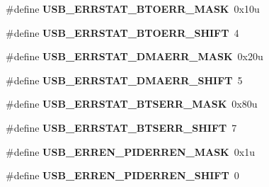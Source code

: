 \begin{DoxyCompactItemize}
\item 
\#define {\bfseries U\+S\+B\+\_\+\+E\+R\+R\+S\+T\+A\+T\+\_\+\+B\+T\+O\+E\+R\+R\+\_\+\+M\+A\+SK}~0x10u\hypertarget{group__USB__Register__Masks_ga64f9bd307b556ecbd454571aa2d1b4c8}{}\label{group__USB__Register__Masks_ga64f9bd307b556ecbd454571aa2d1b4c8}

\item 
\#define {\bfseries U\+S\+B\+\_\+\+E\+R\+R\+S\+T\+A\+T\+\_\+\+B\+T\+O\+E\+R\+R\+\_\+\+S\+H\+I\+FT}~4\hypertarget{group__USB__Register__Masks_gaa6f963350f684e982457839f7bc842e5}{}\label{group__USB__Register__Masks_gaa6f963350f684e982457839f7bc842e5}

\item 
\#define {\bfseries U\+S\+B\+\_\+\+E\+R\+R\+S\+T\+A\+T\+\_\+\+D\+M\+A\+E\+R\+R\+\_\+\+M\+A\+SK}~0x20u\hypertarget{group__USB__Register__Masks_ga3941bf3fbbca724b3b26a09bb2432581}{}\label{group__USB__Register__Masks_ga3941bf3fbbca724b3b26a09bb2432581}

\item 
\#define {\bfseries U\+S\+B\+\_\+\+E\+R\+R\+S\+T\+A\+T\+\_\+\+D\+M\+A\+E\+R\+R\+\_\+\+S\+H\+I\+FT}~5\hypertarget{group__USB__Register__Masks_ga2e3f280874ee203f1f801206ab4254be}{}\label{group__USB__Register__Masks_ga2e3f280874ee203f1f801206ab4254be}

\item 
\#define {\bfseries U\+S\+B\+\_\+\+E\+R\+R\+S\+T\+A\+T\+\_\+\+B\+T\+S\+E\+R\+R\+\_\+\+M\+A\+SK}~0x80u\hypertarget{group__USB__Register__Masks_ga9cfa1a07c56005e5d545ecf363c4e916}{}\label{group__USB__Register__Masks_ga9cfa1a07c56005e5d545ecf363c4e916}

\item 
\#define {\bfseries U\+S\+B\+\_\+\+E\+R\+R\+S\+T\+A\+T\+\_\+\+B\+T\+S\+E\+R\+R\+\_\+\+S\+H\+I\+FT}~7\hypertarget{group__USB__Register__Masks_ga4827905bfe176b3ba2992ce3ff9a4575}{}\label{group__USB__Register__Masks_ga4827905bfe176b3ba2992ce3ff9a4575}

\item 
\#define {\bfseries U\+S\+B\+\_\+\+E\+R\+R\+E\+N\+\_\+\+P\+I\+D\+E\+R\+R\+E\+N\+\_\+\+M\+A\+SK}~0x1u\hypertarget{group__USB__Register__Masks_ga971e0d8939196ec3990a73b4db4030ad}{}\label{group__USB__Register__Masks_ga971e0d8939196ec3990a73b4db4030ad}

\item 
\#define {\bfseries U\+S\+B\+\_\+\+E\+R\+R\+E\+N\+\_\+\+P\+I\+D\+E\+R\+R\+E\+N\+\_\+\+S\+H\+I\+FT}~0\hypertarget{group__USB__Register__Masks_ga47a2a895b1b94a32aa482d11173e2fb9}{}\label{group__USB__Register__Masks_ga47a2a895b1b94a32aa482d11173e2fb9}


\end{DoxyCompactItemize}
